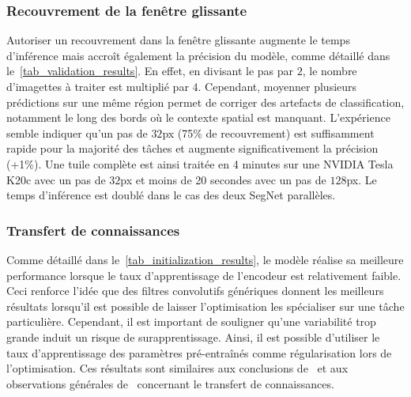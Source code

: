 \subsubsection{Recouvrement de la fenêtre glissante}

Autoriser un recouvrement dans la fenêtre glissante augmente le temps d'inférence mais accroît également la précision du modèle, comme détaillé dans le~\cref{tab_validation_results}. En effet, en divisant le pas par $2$, le nombre d'imagettes à traiter est multiplié par $4$. Cependant, moyenner plusieurs prédictions sur une même région permet de corriger des artefacts de classification, notamment le long des bords où le contexte spatial est manquant. L'expérience semble indiquer qu'un pas de $32$px (75\% de recouvrement) est suffisamment rapide pour la majorité des tâches et augmente significativement la précision (+1\%). Une tuile complète est ainsi traitée en 4 minutes sur une NVIDIA Tesla K20c avec un pas de $32$px et moins de 20 secondes avec un pas de $128$px. Le temps d'inférence est doublé dans le cas des deux SegNet parallèles.

\subsubsection{Transfert de connaissances}

Comme détaillé dans le~\cref{tab_initialization_results}, le modèle réalise sa meilleure performance lorsque le taux d'apprentissage de l'encodeur est relativement faible. Ceci renforce l'idée que des filtres convolutifs génériques donnent les meilleurs résultats lorsqu'il est possible de laisser l'optimisation les spécialiser sur une tâche particulière. Cependant, il est important de souligner qu'une variabilité trop grande induit un risque de surapprentissage. Ainsi, il est possible d'utiliser le taux d'apprentissage des paramètres pré-entraînés comme régularisation lors de l'optimisation. Ces résultats sont similaires aux conclusions de~\cite{nogueira_towards_2017} et aux observations générales de~\cite{yosinski_how_2014} concernant le transfert de connaissances.




